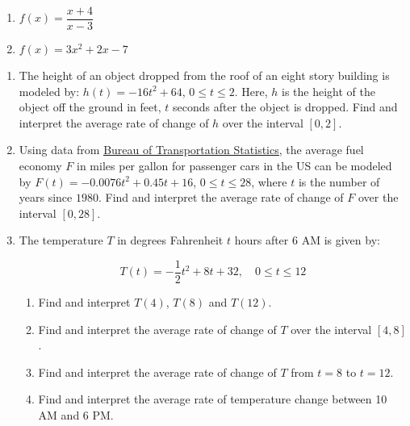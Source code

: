 \begin{multicols}{2}
\begin{enumerate}
\setcounter{enumi}{\value{HW}}

\item $f(x) = \dfrac{x + 4}{x - 3}$
\item $f(x) = 3x^{2} + 2x - 7$  \label{differexerlast}

\setcounter{HW}{\value{enumi}}
\end{enumerate}
\end{multicols}

\begin{enumerate}
\setcounter{enumi}{\value{HW}}

\item  The height of an object dropped from the roof of an eight story building is modeled by:  $h(t) = -16t^2 + 64$, $0 \leq t \leq 2$. Here,  $h$ is the height of the object off the ground in feet, $t$ seconds after the object is dropped.  Find and interpret the average rate of change of $h$ over the interval $[0,2]$.

\item Using data from \href{http://www.bts.gov/publications/national_transportation_statistics/html/table_04_23.html}{\underline{Bureau of Transportation Statistics}}, the average fuel economy $F$ in miles per gallon for passenger cars in the US can be modeled by  $F(t) = -0.0076t^2+0.45t + 16$, $0 \leq t \leq 28$, where $t$ is the number of years since $1980$. Find and interpret the average rate of change of $F$ over the interval $[0,28]$.

\item  The temperature $T$ in degrees Fahrenheit $t$ hours after 6 AM is given by:

\[ T(t) = -\frac{1}{2} t^2 + 8t+32, \quad 0 \leq t \leq 12\]

\begin{enumerate}

\item  Find and interpret $T(4)$, $T(8)$ and $T(12)$.

\item  Find and interpret the average rate of change of $T$ over the interval $[4,8]$.

\item  Find and interpret the average rate of change of $T$ from $t=8$ to $t=12$.

\item  Find and interpret the average rate of temperature change between 10 AM and 6 PM.


\end{enumerate}
\end{enumerate}
